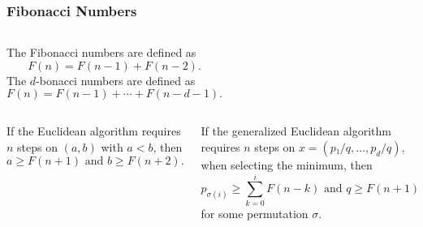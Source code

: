 \documentclass[aspectratio=169]{beamer}
\begin{document}
\begin{frame}
  \frametitle{Fibonacci Numbers}
  \small
  \begin{columns}[T]
    The Fibonacci numbers are defined as
    \[
      F(n) = F(n - 1) + F(n - 2).
    \]
    The $d$-bonacci numbers are defined as
    \[
      F(n) = F(n - 1) + ⋯ + F(n - d - 1).
    \]
  \end{columns}
  \vspace{1em}
  \begin{columns}[T]
    \begin{theorem}
      If the Euclidean algorithm requires $n$ steps on $(a, b)$ with $a < b$,
      then \[
        a ≥ F(n+1) \text{ and } b ≥ F(n+2).
      \]
    \end{theorem}

    \begin{theorem}
      If the generalized Euclidean algorithm requires $n$ steps on $x = (p₁/q, …, p_d/q)$,
      when selecting the minimum,
      then \[
        p_{σ(i)} ≥ ∑_{k=0}^i F(n-k) \text{ and } q ≥ F(n+1)
      \]
      for some permutation $σ$.
    \end{theorem}
  \end{columns}
\end{frame}
\end{document}
